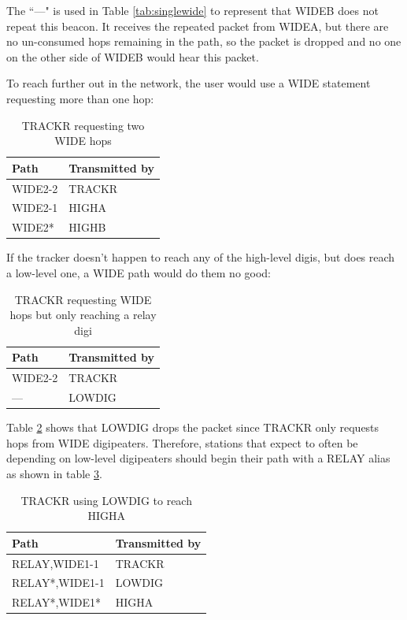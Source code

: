 The ``---" is used in Table \ref{tab:singlewide} to represent that WIDEB does not
repeat this beacon.
It receives the repeated packet from WIDEA, but there are no un-consumed
hops remaining in the path, so the packet is dropped and no one on the other
side of WIDEB would hear this packet.

To reach further out in the network, the user would use a WIDE statement requesting
more than one hop:
\begin{table}[!h]
	\centering
	\begin{tabular}{ | l | l | }
		\hline
		Path & Transmitted by \\ \hline
		WIDE2-2 & TRACKR \\ \hline
		WIDE2-1 & HIGHA \\ \hline
		WIDE2* & HIGHB \\ \hline
	\end{tabular}
	\caption{TRACKR requesting two WIDE hops}
	\label{tab:twowide}
\end{table}

If the tracker doesn't happen to reach any of the high-level digis, 
but does reach a low-level one, a WIDE path would do them no good:

\begin{table}[!h]
	\centering
	\begin{tabular}{ | l | l | }
		\hline
		Path & Transmitted by \\ \hline
		WIDE2-2 & TRACKR \\ \hline
		--- & LOWDIG \\ \hline
	\end{tabular}
	\caption{TRACKR requesting WIDE hops but only reaching a relay digi}
	\label{tab:lowhearswide}
\end{table}

Table \ref{tab:lowhearswide} shows that LOWDIG drops the packet since
TRACKR only requests hops from WIDE digipeaters.
Therefore, stations that expect to often be depending on low-level
digipeaters should begin their path with a RELAY alias
as shown in table \ref{tab:lowusingrelay}.

\begin{table}[!h]
	\centering
	\begin{tabular}{ | l | l | }
		\hline
		Path & Transmitted by \\ \hline
		RELAY,WIDE1-1 & TRACKR \\ \hline
		RELAY*,WIDE1-1 & LOWDIG \\ \hline
		RELAY*,WIDE1* & HIGHA \\ \hline
	\end{tabular}
	\caption{TRACKR using LOWDIG to reach HIGHA}
	\label{tab:lowusingrelay}
\end{table}

